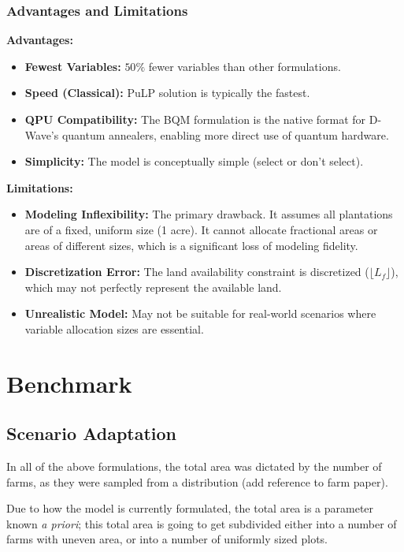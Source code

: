 \documentclass{article}
\begin{document}
\subsubsection{Advantages and Limitations}
\begin{multicols}{2}
    \textbf{Advantages:}
\begin{itemize}
    \item \textbf{Fewest Variables:} $50\%$ fewer variables than other formulations.
    \item \textbf{Speed (Classical):} PuLP solution is typically the fastest.
    \item \textbf{QPU Compatibility:} The BQM formulation is the native format for D-Wave's quantum annealers, enabling more direct use of quantum hardware.
    \item \textbf{Simplicity:} The model is conceptually simple (select or don't select).
\end{itemize}
\columnbreak
\textbf{Limitations:}
\begin{itemize}
    \item \textbf{Modeling Inflexibility:} The primary drawback. It assumes all plantations are of a fixed, uniform size (1 acre). It cannot allocate fractional areas or areas of different sizes, which is a significant loss of modeling fidelity.
    \item \textbf{Discretization Error:} The land availability constraint is discretized ($\lfloor L_f \rfloor$), which may not perfectly represent the available land.
    \item \textbf{Unrealistic Model:} May not be suitable for real-world scenarios where variable allocation sizes are essential.
\end{itemize}
\end{multicols}


\newpage


\section{Benchmark}


\subsection{Scenario Adaptation}

In all of the above formulations, the total area was dictated by the number of farms, as they were sampled from a distribution (add reference to farm paper).

Due to how the model is currently formulated, the total area is a parameter known \textit{a priori}; this total area is going to get subdivided either into a number of farms with uneven area, or into a number of uniformly sized plots.
\end{document}
